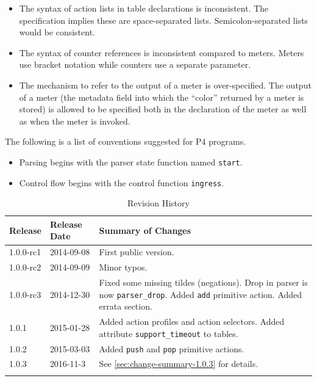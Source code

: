 \documentclass[12pt]{article}
\begin{document}


\begin{itemize}
\item The syntax of action lists in table declarations is inconsistent. The specification implies these are space-separated lists. Semicolon-separated lists would be consistent.
\item The syntax of counter references is inconsistent compared to meters. Meters use bracket notation while counters use a separate parameter.
\item The mechanism to refer to the output of a meter is over-specified. The output of a meter (the metadata field into which the ``color'' returned by a meter is stored) is allowed to be specified both in the declaration of the meter as well as when the meter is invoked.
\end{itemize}



The following is a list of conventions suggested for P4 programs.

\begin{itemize}
\item
Parsing begins with the parser state function named \texttt{start}.
\item
Control flow begins with the control function \texttt{ingress}.
\end{itemize}



\begin{table}[H]
\begin{center}
\begin{tabular}{| l | l | p{} |} \hline
\textbf{Release} &
\textbf{Release Date} &
\textbf{Summary of Changes} \\  \hline
1.0.0-rc1 & 2014-09-08 & First public version. \\  \hline
1.0.0-rc2 & 2014-09-09 & Minor typos. \\  \hline
1.0.0-rc3 & 2014-12-30 & Fixed some missing tildes (negations). Drop in parser is now \texttt{parser_drop}. Added \texttt{add} primitive action. Added errata section. \\  \hline
1.0.1 & 2015-01-28 & Added action profiles and action selectors. Added attribute \texttt{support_timeout} to tables. \\  \hline
1.0.2 & 2015-03-03 & Added \texttt{push} and \texttt{pop} primitive actions. \\  \hline
1.0.3 & 2016-11-3 & See \ref{sec:change-summary-1.0.3} for details. \\ \hline
}
\end{tabular}
\end{center}
\caption{Revision History}
\label{tab:revhistory}
\end{table}
\end{document}
